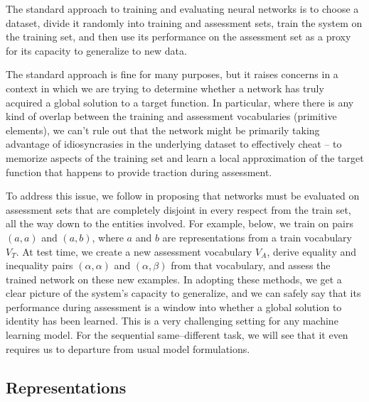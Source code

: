\documentclass[9pt,twocolumn,twoside,lineno]{pnas-new}
\newcommand{\update}[1]{{\color{darkblue}#1}}
\begin{document}
The standard approach to training and evaluating neural networks is to choose a dataset, divide it randomly into training and assessment sets, train the system on the training set, and then use its performance on the assessment set as a proxy for its capacity to generalize to new data.

The standard approach is fine for many purposes, but it raises concerns in a context in which we are trying to determine whether a network has truly acquired a global solution to a target function. In particular, where there is any kind of overlap between the training and assessment vocabularies (primitive elements), we can't rule out that the network might be primarily taking advantage of idiosyncrasies in the underlying dataset to effectively cheat -- to memorize aspects of the training set and learn a local approximation of the target function that happens to provide traction during assessment.

To address this issue, \update{we follow \citet{marcus:1999} in proposing} that networks must be evaluated on assessment sets that are completely disjoint in every respect from the train set, all the way down to the entities involved. For example, below, we train on pairs $(a, a)$ and $(a, b)$, where $a$ and $b$ are representations from a train vocabulary $V_{T}$. At test time, we create a new assessment vocabulary $V_{A}$, derive equality and inequality pairs $(\alpha, \alpha)$ and $(\alpha, \beta)$ from that vocabulary, and assess the trained network on these new examples. \update{ In adopting these methods, we get a clear picture of the system's capacity to generalize, and we can safely say that its performance during assessment is a window into whether a global solution to identity has been learned. This is a very challenging setting for any machine learning model. For the sequential same--different task, we will see that it even requires us to departure from usual model formulations.}




\subsection*{Representations}\label{sec:representations}

\newcommand{\mysquare}{
\begin{tikzpicture}[scale=0.5]
  \node[rectangle, fill=red!100, minimum height=3mm, minimum width=3mm]{};
\end{tikzpicture}}
\end{document}
